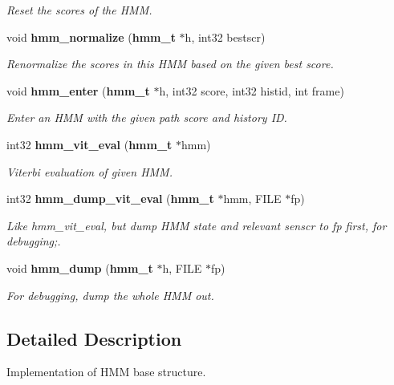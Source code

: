 \begin{DoxyCompactItemize}
\begin{DoxyCompactList}\small\item\em Reset the scores of the H\+M\+M. \end{DoxyCompactList}\item 
void {\bf hmm\+\_\+normalize} ({\bf hmm\+\_\+t} $\ast$h, int32 bestscr)\label{hmm_8h_a0438bc7672ff9200274ffe7b5051eb92}

\begin{DoxyCompactList}\small\item\em Renormalize the scores in this H\+M\+M based on the given best score. \end{DoxyCompactList}\item 
void {\bf hmm\+\_\+enter} ({\bf hmm\+\_\+t} $\ast$h, int32 score, int32 histid, int frame)\label{hmm_8h_a7285d01d533996d750c78e0d96042716}

\begin{DoxyCompactList}\small\item\em Enter an H\+M\+M with the given path score and history I\+D. \end{DoxyCompactList}\item 
int32 {\bf hmm\+\_\+vit\+\_\+eval} ({\bf hmm\+\_\+t} $\ast$hmm)
\begin{DoxyCompactList}\small\item\em Viterbi evaluation of given H\+M\+M. \end{DoxyCompactList}\item 
int32 {\bf hmm\+\_\+dump\+\_\+vit\+\_\+eval} ({\bf hmm\+\_\+t} $\ast$hmm, F\+I\+L\+E $\ast$fp)
\begin{DoxyCompactList}\small\item\em Like hmm\+\_\+vit\+\_\+eval, but dump H\+M\+M state and relevant senscr to fp first, for debugging;. \end{DoxyCompactList}\item 
void {\bf hmm\+\_\+dump} ({\bf hmm\+\_\+t} $\ast$h, F\+I\+L\+E $\ast$fp)
\begin{DoxyCompactList}\small\item\em For debugging, dump the whole H\+M\+M out. \end{DoxyCompactList}\end{DoxyCompactItemize}


\subsection{Detailed Description}
Implementation of H\+M\+M base structure. 

